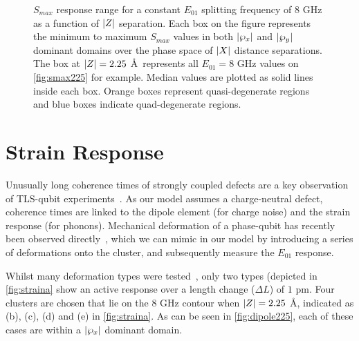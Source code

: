 \begin{figure}[htp]
\resizebox{\textwidth}{!}{}
\caption[$S_{max}$ Response Range]{\label{fig:smaxz}$S_{max}$ response range for a constant $E_{01}$ splitting frequency of $8$ GHz as a function of $\lvert Z\rvert$ separation. Each box on the figure represents the minimum to maximum $S_{max}$ values in both $\lvert\wp_{x}\rvert$ and $\lvert\wp_{y}\rvert$ dominant domains over the phase space of $\lvert X\rvert$ distance separations. The box at $\lvert Z\rvert = 2.25$ \AA\ represents all $E_{01} = 8$ GHz values on \cref{fig:smax225} for example. Median values are plotted as solid lines inside each box. Orange boxes represent quasi-degenerate regions and blue boxes indicate quad-degenerate regions.}
\end{figure}

\section{Strain Response}\label{sec:strain}

Unusually long coherence times of strongly coupled defects are a key observation of TLS-qubit experiments~\cite{Neeley2008, Lisenfeld2010a}.
As our model assumes a charge-neutral defect, coherence times are linked to the dipole element (for charge noise) and the strain response (for phonons).
Mechanical deformation of a phase-qubit has recently been observed directly~\cite{Grabovskij2012}, which we can mimic in our  model by introducing a series of deformations onto the cluster, and subsequently measure the $E_{01}$ response.

Whilst many deformation types were tested~\cite{DuBois2013}, only two types (depicted in \cref{fig:straina} show an active response over a length change ($\Delta L$) of $1$ pm.
Four clusters are chosen that lie on the $8$ GHz contour when $\lvert Z\rvert = 2.25$ \AA, indicated as (b), (c), (d) and (e) in \cref{fig:straina}.
As can be seen in \cref{fig:dipole225}, each of these cases are within a $\lvert\wp_x\rvert$ dominant domain.

